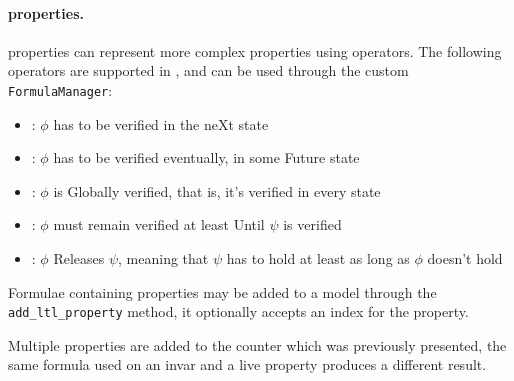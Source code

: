 \paragraph*{\ltl{} properties.}

\ltl{} properties can represent more complex properties using \LTL{} operators.
The following \ltl{} operators are supported in \pyvmt{}, and can be used through the \pyvmt{} custom \texttt{FormulaManager}:
\begin{itemize}
    \item \fX{}: $\phi$ has to be verified in the neXt state
    \item \fF{}: $\phi$ has to be verified eventually, in some Future state
    \item \fG{}: $\phi$ is Globally verified, that is, it's verified in every state
    \item \fU{}: $\phi$ must remain verified at least Until $\psi$ is verified
    \item \fR{}: $\phi$ Releases $\psi$, meaning that $\psi$ has to hold at least as long as $\phi$ doesn't hold
\end{itemize}
Formulae containing \ltl{} properties may be added to a model through the \texttt{add\_ltl\_property} method, it optionally accepts an index for the property.

\begin{listing}
    \label{alg:properties}
    \caption{Multiple properties are added to the counter which was previously presented, the same formula used on an invar and a live property produces a different result.}
\end{listing}


